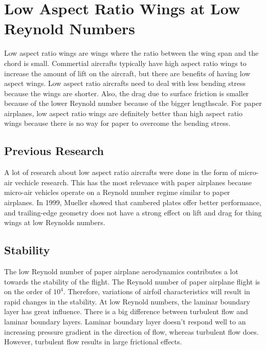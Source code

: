 \chapter{Low Aspect Ratio Wings at Low Reynold Numbers}

Low aspect ratio wings are wings where the ratio between the wing span and
the chord is small. Commertial aircrafts typically have high aspect ratio wings
to increase the amount of lift on the aircraft, but there are benefits of having
low aspect wings. Low aspect ratio aircrafts need to deal with less bending
stress because the wings are shorter. Also, the drag due to surface friction is
smaller because of the lower Reynold number because of the bigger lengthscale.
For paper airplanes, low aspect ratio wings are definitely better than high
aspect ratio wings because there is no way for paper to overcome the
bending stress.


\section{Previous Research}

A lot of research about low aspect ratio aircrafts were done in the form of
micro-air vechicle research. This has the most relevance with paper airplanes because
micro-air vehicles operate on a Reynold number regime similar to paper airplanes. 
In 1999, Mueller showed that cambered plates offer better performance, and
trailing-edge geometry does not have a strong effect on lift and drag
for thing wings at low Reynolds numbers.

\section{Stability}

The low Reynold number of paper airplane aerodynamics contributes a lot towards the
stability of the flight.
The Reynold number of paper airplane flight is on the order of $10^4$.
Therefore, variations of airfoil characteristics will result in rapid changes in 
the stability. At low Reynold numbers, the laminar boundary layer has great 
influence. There is a big difference between turbulent flow and laminar boundary
layers. Laminar boundary layer doesn't respond well to an increasing
pressure gradient in the direction of flow, whereas turbulent flow does.
However, turbulent flow results in large frictional effects.

